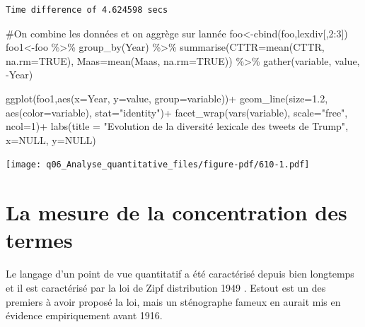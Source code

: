 \documentclass[
  letterpaper,
  DIV=11,
  numbers=noendperiod]{scrreprt}
\newenvironment{Shaded}{\begin{snugshade}}{\end{snugshade}}
\newcommand{\AttributeTok}[1]{\textcolor[rgb]{0.40,0.45,0.13}{#1}}
\newcommand{\CommentTok}[1]{\textcolor[rgb]{0.37,0.37,0.37}{#1}}
\newcommand{\ConstantTok}[1]{\textcolor[rgb]{0.56,0.35,0.01}{#1}}
\newcommand{\DecValTok}[1]{\textcolor[rgb]{0.68,0.00,0.00}{#1}}
\newcommand{\FloatTok}[1]{\textcolor[rgb]{0.68,0.00,0.00}{#1}}
\newcommand{\FunctionTok}[1]{\textcolor[rgb]{0.28,0.35,0.67}{#1}}
\newcommand{\NormalTok}[1]{\textcolor[rgb]{0.00,0.23,0.31}{#1}}
\newcommand{\OtherTok}[1]{\textcolor[rgb]{0.00,0.23,0.31}{#1}}
\newcommand{\SpecialCharTok}[1]{\textcolor[rgb]{0.37,0.37,0.37}{#1}}
\newcommand{\StringTok}[1]{\textcolor[rgb]{0.13,0.47,0.30}{#1}}
\begin{document}
\begin{verbatim}
Time difference of 4.624598 secs
\end{verbatim}

\begin{Shaded}
\begin{Highlighting}[]
\CommentTok{\#On combine les données et on aggrège sur l\textquotesingle{}année}
\NormalTok{foo}\OtherTok{\textless{}{-}}\FunctionTok{cbind}\NormalTok{(foo,lexdiv[,}\DecValTok{2}\SpecialCharTok{:}\DecValTok{3}\NormalTok{])}
\NormalTok{foo1}\OtherTok{\textless{}{-}}\NormalTok{foo }\SpecialCharTok{\%\textgreater{}\%} 
  \FunctionTok{group\_by}\NormalTok{(Year) }\SpecialCharTok{\%\textgreater{}\%}
  \FunctionTok{summarise}\NormalTok{(}\AttributeTok{CTTR=}\FunctionTok{mean}\NormalTok{(CTTR, }\AttributeTok{na.rm=}\ConstantTok{TRUE}\NormalTok{), }
            \AttributeTok{Maas=}\FunctionTok{mean}\NormalTok{(Maas, }\AttributeTok{na.rm=}\ConstantTok{TRUE}\NormalTok{)) }\SpecialCharTok{\%\textgreater{}\%}
  \FunctionTok{gather}\NormalTok{(variable, value, }\SpecialCharTok{{-}}\NormalTok{Year)}

\FunctionTok{ggplot}\NormalTok{(foo1,}\FunctionTok{aes}\NormalTok{(}\AttributeTok{x=}\NormalTok{Year, }\AttributeTok{y=}\NormalTok{value, }\AttributeTok{group=}\NormalTok{variable))}\SpecialCharTok{+}
  \FunctionTok{geom\_line}\NormalTok{(}\AttributeTok{size=}\FloatTok{1.2}\NormalTok{, }\FunctionTok{aes}\NormalTok{(}\AttributeTok{color=}\NormalTok{variable), }\AttributeTok{stat=}\StringTok{"identity"}\NormalTok{)}\SpecialCharTok{+}
  \FunctionTok{facet\_wrap}\NormalTok{(}\FunctionTok{vars}\NormalTok{(variable), }\AttributeTok{scale=}\StringTok{"free"}\NormalTok{, }\AttributeTok{ncol=}\DecValTok{1}\NormalTok{)}\SpecialCharTok{+}
  \FunctionTok{labs}\NormalTok{(}\AttributeTok{title =} \StringTok{"Evolution de la diversité lexicale des tweets de Trump"}\NormalTok{, }\AttributeTok{x=}\ConstantTok{NULL}\NormalTok{, }\AttributeTok{y=}\ConstantTok{NULL}\NormalTok{)}
\end{Highlighting}
\end{Shaded}

\texttt{[image: q06\_Analyse\_quantitative\_files/figure-pdf/610-1.pdf]}

\section{La mesure de la concentration des
termes}\label{la-mesure-de-la-concentration-des-termes}

Le langage d'un point de vue quantitatif a été caractérisé depuis bien
longtemps et il est caractérisé par la loi de Zipf distribution 1949 .
Estout est un des premiers à avoir proposé la loi, mais un sténographe
fameux en aurait mis en évidence empiriquement avant 1916.
\end{document}
